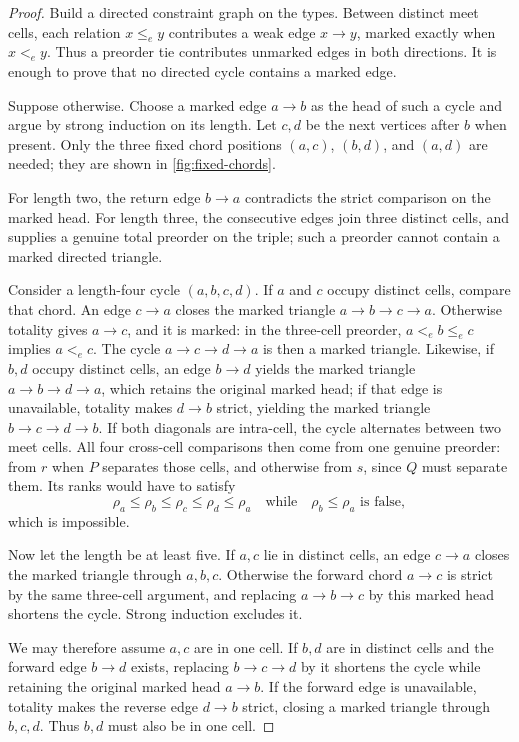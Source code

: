 \begin{proof}
Build a directed constraint graph on the types.  Between distinct meet cells,
each relation \(x\le_e y\) contributes a weak edge \(x\to y\), marked exactly
when \(x<_e y\).  Thus a preorder tie contributes unmarked edges in both
directions.  It is enough to prove that no directed cycle contains a marked
edge.

Suppose otherwise.  Choose a marked edge \(a\to b\) as the head of such a
cycle and argue by strong induction on its length.  Let \(c,d\) be the next
vertices after \(b\) when present.  Only the three fixed chord positions
\((a,c)\), \((b,d)\), and \((a,d)\) are needed; they are shown in
\autoref{fig:fixed-chords}.

For length two, the return edge \(b\to a\) contradicts the strict comparison
on the marked head.  For length three, the consecutive edges join three
distinct cells, and  supplies a genuine total preorder on
the triple; such a preorder cannot contain a marked directed triangle.

Consider a length-four cycle \((a,b,c,d)\).  If \(a\) and \(c\) occupy
distinct cells, compare that chord.  An edge \(c\to a\) closes the marked
triangle \(a\to b\to c\to a\).  Otherwise totality gives \(a\to c\), and it
is marked: in the three-cell preorder, \(a<_e b\le_e c\) implies
\(a<_e c\).  The cycle \(a\to c\to d\to a\) is then a marked triangle.
Likewise, if \(b,d\) occupy distinct cells, an edge \(b\to d\) yields the
marked triangle \(a\to b\to d\to a\), which retains the original marked
head; if that edge is unavailable, totality makes \(d\to b\) strict, yielding
the marked triangle \(b\to c\to d\to b\).  If both diagonals are intra-cell,
the cycle alternates between two meet cells.
All four cross-cell comparisons then come from one genuine preorder: from
\(r\) when \(P\) separates those cells, and otherwise from \(s\), since \(Q\)
must separate them.  Its ranks would have to satisfy
\[
 \rho_a\le\rho_b\le\rho_c\le\rho_d\le\rho_a
 \quad\text{while}\quad
 \rho_b\le\rho_a\text{ is false},
\]
which is impossible.

Now let the length be at least five.  If \(a,c\) lie in distinct cells, an
edge \(c\to a\) closes the marked triangle through \(a,b,c\).  Otherwise the
forward chord \(a\to c\) is strict by the same three-cell argument, and
replacing \(a\to b\to c\) by this marked head shortens the cycle.  Strong
induction excludes it.

We may therefore assume \(a,c\) are in one cell.  If \(b,d\) are in distinct
cells and the forward edge \(b\to d\) exists, replacing
\(b\to c\to d\) by it shortens the cycle while retaining the original marked
head \(a\to b\).  If the forward edge is unavailable, totality makes the
reverse edge \(d\to b\) strict, closing a marked triangle through \(b,c,d\).
Thus \(b,d\) must also be in one cell.


\end{proof}
